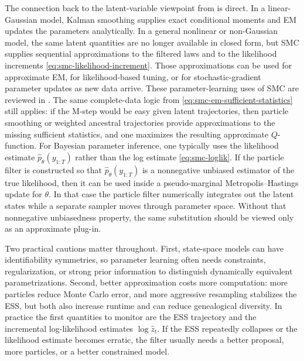 The connection back to the latent-variable viewpoint from  is direct.
In a linear-Gaussian model, Kalman smoothing supplies exact conditional moments and EM updates the parameters analytically.
In a general nonlinear or non-Gaussian model, the same latent quantities are no longer available in closed form, but SMC supplies sequential approximations to the filtered laws and to the likelihood increments \eqref{eq:smc-likelihood-increment}.
Those approximations can be used for approximate EM, for likelihood-based tuning, or for stochastic-gradient parameter updates as new data arrive.
These parameter-learning uses of SMC are reviewed in \citet[\S\S3.4.3--3.4.4]{liu_2002_monte_carlo}.
The same complete-data logic from \eqref{eq:smc-em-sufficient-statistics} still applies:
if the M-step would be easy given latent trajectories, then particle smoothing or weighted ancestral trajectories provide approximations to the missing sufficient statistics, and one maximizes the resulting approximate $Q$-function.
For Bayesian parameter inference, one typically uses the likelihood estimate $\hat p_\theta(y_{1:T})$ rather than the log estimate \eqref{eq:smc-loglik}.
If the particle filter is constructed so that $\hat p_\theta(y_{1:T})$ is a nonnegative unbiased estimator of the true likelihood, then it can be used inside a pseudo-marginal Metropolis--Hastings update for $\theta$.
In that case the particle filter numerically integrates out the latent states while a separate sampler moves through parameter space.
Without that nonnegative unbiasedness property, the same substitution should be viewed only as an approximate plug-in.

Two practical cautions matter throughout.
First, state-space models can have identifiability symmetries, so parameter learning often needs constraints, regularization, or strong prior information to distinguish dynamically equivalent parametrizations.
Second, better approximation costs more computation:
more particles reduce Monte Carlo error, and more aggressive resampling stabilizes the ESS, but both also increase runtime and can reduce genealogical diversity.
In practice the first quantities to monitor are the ESS trajectory and the incremental log-likelihood estimates $\log \hat z_t$.
If the ESS repeatedly collapses or the likelihood estimate becomes erratic, the filter usually needs a better proposal, more particles, or a better constrained model.
